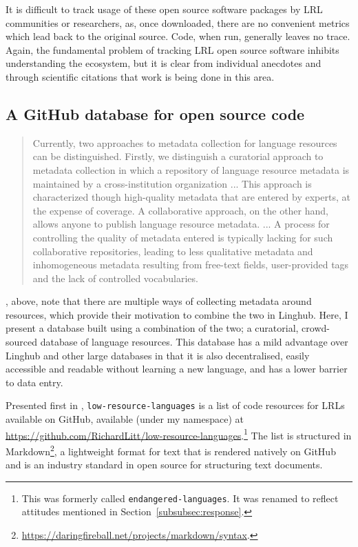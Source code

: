 It is difficult to track usage of these open source software packages by LRL communities or researchers, as, once downloaded, there are no convenient metrics which lead back to the original source. Code, when run, generally leaves no trace. Again, the fundamental problem of tracking LRL open source software inhibits understanding the ecosystem, but it is clear from individual anecdotes and through scientific citations that work is being done in this area.

\subsection{A GitHub database for open source code}
\label{sec:solutions}

\begin{quote}
Currently, two approaches to metadata collection for language resources can be distinguished. Firstly, we distinguish a curatorial approach to metadata collection in which a repository of language resource metadata is maintained by a cross-institution organization ... This approach is characterized though high-quality metadata that are entered by experts, at the expense of coverage. A collaborative approach, on the other hand, allows anyone to publish language resource metadata. ... A process for controlling the quality of metadata entered is typically lacking for such collaborative repositories, leading to less qualitative metadata and inhomogeneous metadata resulting from free-text fields, user-provided tags and the lack of controlled vocabularies.
\end{quote}

\citet{mccrae2015linghub}, above, note that there are multiple ways of collecting metadata around resources, which provide their motivation to combine the two in Linghub. Here, I present a database built using a combination of the two; a curatorial, crowd-sourced database of language resources. This database has a mild advantage over Linghub and other large databases in that it is also decentralised, easily accessible and readable without learning a new language, and has a lower barrier to data entry.

Presented first in \citet{CCURL}, {\tt low-resource-languages} is a list of code resources for LRLs available on GitHub, available (under my namespace) at \href{https://github.com/RichardLitt/low-resource-languages}{https://github.com/RichardLitt/low-resource-languages}.\footnote{This was formerly called {\tt endangered-languages}. It was renamed to reflect attitudes mentioned in Section~\ref{subsubsec:response}.} The list is structured in Markdown\footnote{\href{https://daringfireball.net/projects/markdown/syntax}{https://daringfireball.net/projects/markdown/syntax}. }, a lightweight format for text that is rendered natively on GitHub and is an industry standard in open source for structuring text documents.

